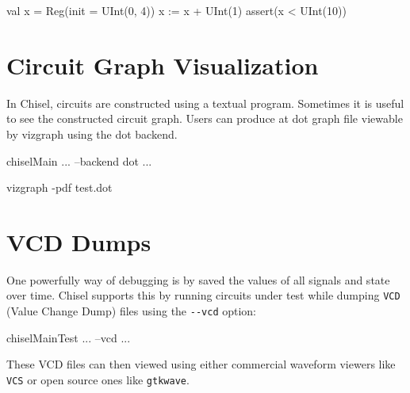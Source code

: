 \begin{scala}
val x = Reg(init = UInt(0, 4))
x := x + UInt(1)
assert(x < UInt(10))
\end{scala}

\section{Circuit Graph Visualization}

In Chisel, circuits are constructed using a textual program.
Sometimes it is useful to see the constructed circuit graph.
Users can produce at dot graph file viewable by vizgraph using the dot backend.


\begin{scala}
chiselMain ... --backend dot ...
\end{scala}

\begin{bash}
vizgraph -pdf test.dot
\end{bash}

\section{VCD Dumps}

One powerfully way of debugging is by saved the values of all signals and state over time.
Chisel supports this by running circuits under test while 
dumping \verb+VCD+ (Value Change Dump) files using the \verb+--vcd+ option:

\begin{bash}
chiselMainTest ... --vcd ...
\end{bash}

These VCD files can then viewed using either commercial waveform viewers like \verb+VCS+ or open source ones like \verb+gtkwave+.


% 
